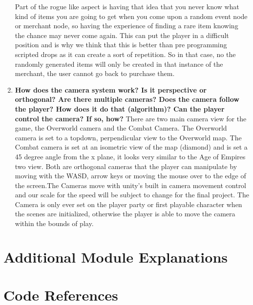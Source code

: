 \documentclass[12pt, titlepage]{article}
\begin{document}
\begin{enumerate}
	Part of the rogue like aspect is having that idea that you never know what kind of items you are going to get when you come upon a random event node or merchant node, so having the experience of finding a rare item knowing the chance may never come again. This can put the player in a difficult position and is why we think that this is better than pre programming scripted drops as it can create a sort of repetition. So in that case, no the randomly generated items will only be created in that instance of the merchant, the user cannot go back to purchase them.
	\item \textbf{How does the camera system work? Is it perspective or orthogonal? Are there multiple cameras? Does the camera follow the player? How does it do that (algorithm)? Can the player control the camera? If so, how?}
	There are two main camera view for the game, the Overworld camera and the Combat Camera. The Overworld camera is set to a topdown, perpendicular view to the Overworld map. The Combat camera is set at an isometric view of the map (diamond) and is set a 45 degree angle from the x plane, it looks very similar to the Age of Empires two view. Both are orthogonal cameras that the player can manipulate by moving with the WASD, arrow keys or moving the mouse over to the edge of the screen.The Cameras move with unity's built in camera movement control and our scale for the speed will be subject to change for the final project.  The Camera is only ever set on the player party or first playable character when the scenes are initialized, otherwise the player is able to move the camera within the bounds of play. 
\end{enumerate}

\section{Additional Module Explanations}




\section{Code References}
\end{document}
